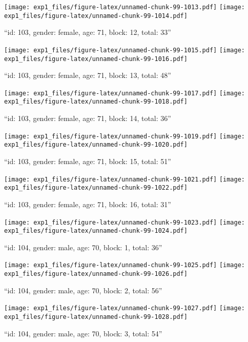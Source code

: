 \documentclass[,]{article}
\begin{document}
\texttt{[image: exp1\_files/figure-latex/unnamed-chunk-99-1013.pdf]}
\texttt{[image: exp1\_files/figure-latex/unnamed-chunk-99-1014.pdf]}

\newpage
[1] 

``id: 103, gender: female, age: 71, block: 12, total: 33''

\texttt{[image: exp1\_files/figure-latex/unnamed-chunk-99-1015.pdf]}
\texttt{[image: exp1\_files/figure-latex/unnamed-chunk-99-1016.pdf]}

\newpage
[1] 

``id: 103, gender: female, age: 71, block: 13, total: 48''

\texttt{[image: exp1\_files/figure-latex/unnamed-chunk-99-1017.pdf]}
\texttt{[image: exp1\_files/figure-latex/unnamed-chunk-99-1018.pdf]}

\newpage
[1] 

``id: 103, gender: female, age: 71, block: 14, total: 36''

\texttt{[image: exp1\_files/figure-latex/unnamed-chunk-99-1019.pdf]}
\texttt{[image: exp1\_files/figure-latex/unnamed-chunk-99-1020.pdf]}

\newpage
[1] 

``id: 103, gender: female, age: 71, block: 15, total: 51''

\texttt{[image: exp1\_files/figure-latex/unnamed-chunk-99-1021.pdf]}
\texttt{[image: exp1\_files/figure-latex/unnamed-chunk-99-1022.pdf]}

\newpage
[1] 

``id: 103, gender: female, age: 71, block: 16, total: 31''

\texttt{[image: exp1\_files/figure-latex/unnamed-chunk-99-1023.pdf]}
\texttt{[image: exp1\_files/figure-latex/unnamed-chunk-99-1024.pdf]}

\newpage
[1] 

``id: 104, gender: male, age: 70, block: 1, total: 36''

\texttt{[image: exp1\_files/figure-latex/unnamed-chunk-99-1025.pdf]}
\texttt{[image: exp1\_files/figure-latex/unnamed-chunk-99-1026.pdf]}

\newpage
[1] 

``id: 104, gender: male, age: 70, block: 2, total: 56''

\texttt{[image: exp1\_files/figure-latex/unnamed-chunk-99-1027.pdf]}
\texttt{[image: exp1\_files/figure-latex/unnamed-chunk-99-1028.pdf]}

\newpage
[1] 

``id: 104, gender: male, age: 70, block: 3, total: 54''
\end{document}
